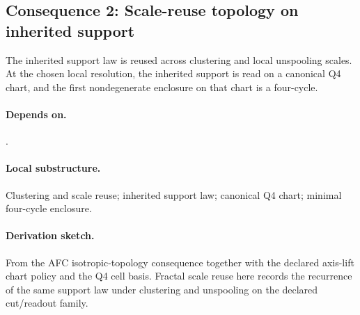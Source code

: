 \subsection{Consequence 2: Scale-reuse topology on inherited support}
\begin{consequence}\label{cons:c2}
The inherited support law is reused across clustering and local unspooling scales. At the chosen local resolution, the inherited support is read on a canonical Q4 chart, and the first nondegenerate enclosure on that chart is a four-cycle.
\end{consequence}
\paragraph{Depends on.} .
\paragraph{Local substructure.} Clustering and scale reuse; inherited support law; canonical Q4 chart; minimal four-cycle enclosure.
\paragraph{Derivation sketch.} From the AFC isotropic-topology consequence together with the declared axis-lift chart policy and the Q4 cell basis. Fractal scale reuse here records the recurrence of the same support law under clustering and unspooling on the declared cut/readout family.
